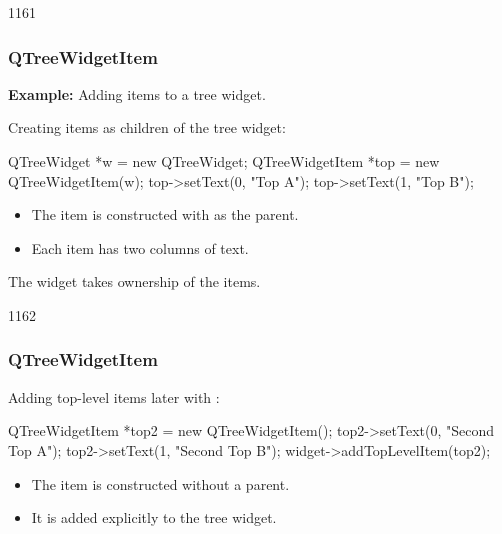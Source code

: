 \begin{slide}[fragile]{1161}\frametitle{QTreeWidgetItem}

\textbf{Example:} Adding items to a tree widget.

\vspace*{0.5em}
Creating items as children of the tree widget:

\vspace*{0.5em}
\begin{cpp}
 QTreeWidget *w = new QTreeWidget;
 QTreeWidgetItem *top = new QTreeWidgetItem(w);
 top->setText(0, "Top A");
 top->setText(1, "Top B");
\end{cpp}

\begin{itemize}
\item The item is constructed with  as the parent.
\item Each item has two columns of text.
\end{itemize}

\vspace*{0.5em}
The widget takes ownership of the items.
\vfill
{}
\end{slide}

\begin{slide}[fragile]{1162}\frametitle{QTreeWidgetItem}

\vspace*{0.5em}
Adding top-level items later with :

\vspace*{0.5em}
\begin{cpp}
QTreeWidgetItem *top2 = new QTreeWidgetItem();
top2->setText(0, "Second Top A");
top2->setText(1, "Second Top B");
widget->addTopLevelItem(top2);
\end{cpp}

\vspace*{1em}
\begin{itemize}
\item The item is constructed without a parent.
\item It is added explicitly to the tree widget.
\end{itemize}

\vfill
{}

\end{slide}

